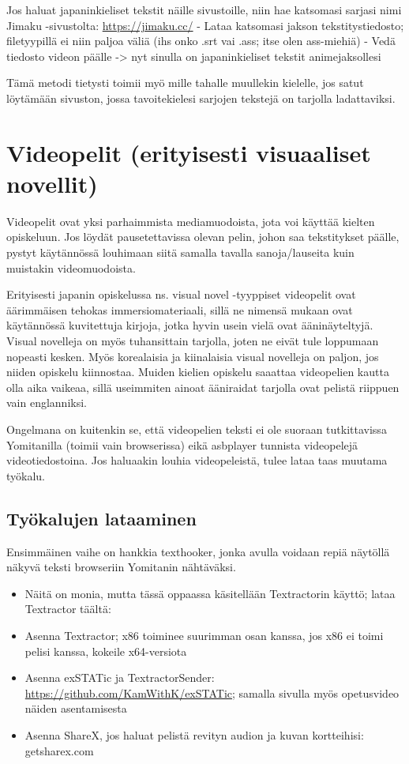 \documentclass[
]{book}
\begin{document}
Jos haluat japaninkieliset tekstit näille sivustoille, niin hae katsomasi sarjasi nimi Jimaku -sivustolta: \url{https://jimaku.cc/}
- Lataa katsomasi jakson tekstitystiedosto; filetyypillä ei niin paljoa väliä (ihs onko .srt vai .ass; itse olen ass-miehiä)
- Vedä tiedosto videon päälle -\textgreater{} nyt sinulla on japaninkieliset tekstit animejaksollesi

Tämä metodi tietysti toimii myö mille tahalle muullekin kielelle, jos satut löytämään sivuston, jossa tavoitekielesi sarjojen tekstejä on tarjolla ladattaviksi.

\chapter{Videopelit (erityisesti visuaaliset novellit)}\label{videopelit-erityisesti-visuaaliset-novellit}

Videopelit ovat yksi parhaimmista mediamuodoista, jota voi käyttää kielten opiskeluun. Jos löydät pausetettavissa olevan pelin, johon saa tekstitykset päälle, pystyt käytännössä louhimaan siitä samalla tavalla sanoja/lauseita kuin muistakin videomuodoista.

Erityisesti japanin opiskelussa ns. visual novel -tyyppiset videopelit ovat äärimmäisen tehokas immersiomateriaali, sillä ne nimensä mukaan ovat käytännössä kuvitettuja kirjoja, jotka hyvin usein vielä ovat ääninäyteltyjä. Visual novelleja on myös tuhansittain tarjolla, joten ne eivät tule loppumaan nopeasti kesken. Myös korealaisia ja kiinalaisia visual novelleja on paljon, jos niiden opiskelu kiinnostaa. Muiden kielien opiskelu saaattaa videopelien kautta olla aika vaikeaa, sillä useimmiten ainoat ääniraidat tarjolla ovat pelistä riippuen vain englanniksi.

Ongelmana on kuitenkin se, että videopelien teksti ei ole suoraan tutkittavissa Yomitanilla (toimii vain browserissa) eikä asbplayer tunnista videopelejä videotiedostoina. Jos haluaakin louhia videopeleistä, tulee lataa taas muutama työkalu.

\section{Työkalujen lataaminen}\label{Tyokalujen-lataaminen}

Ensimmäinen vaihe on hankkia texthooker, jonka avulla voidaan repiä näytöllä näkyvä teksti browseriin Yomitanin nähtäväksi.

\begin{itemize}
\item
  Näitä on monia, mutta tässä oppaassa käsitellään Textractorin käyttö; lataa Textractor täältä:
\item
  Asenna Textractor; x86 toiminee suurimman osan kanssa, jos x86 ei toimi pelisi kanssa, kokeile x64-versiota
\item
  Asenna exSTATic ja TextractorSender: \url{https://github.com/KamWithK/exSTATic}; samalla sivulla myös opetusvideo näiden asentamisesta
\item
  Asenna ShareX, jos haluat pelistä revityn audion ja kuvan kortteihisi: getsharex.com
\end{itemize}
\end{document}
